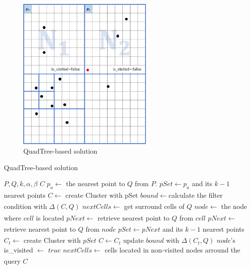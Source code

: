 \documentclass[a4paper,11pt]{report}
\theoremstyle{mytheoremstyle}
\begin{document}
\begin{figure}
    \begin{center}
        \includegraphics[width=0.6\textwidth]{images/solution-QuadTree2.pdf}
        \caption{QuadTree-based solution} \label{fig:solution-quadTree2}
    \end{center}
\end{figure}

\begin{algorithm}                      
\caption{QuadTree-based solution}         
\label{alg:quadtree}
\begin{algorithmic}[1]                  
\renewcommand{\algorithmicrequire}{\textbf{Input:}}
\renewcommand{\algorithmicensure}{\textbf{Output:}}
\REQUIRE $P,Q,k,\alpha, \beta$
\ENSURE $C$
\STATE $p_a \xleftarrow[]{}$ the nearest point to $Q$ from $P$.
\STATE $pSet \xleftarrow{} p_a$ and its $k-1$ nearest points
\STATE $C \xleftarrow[]{}$ create Cluster with pSet
\STATE $bound \xleftarrow[]{} $calculate the filter condition with $\Delta(C,Q)$
\STATE $nextCells \xleftarrow[]{} $ get surround cells of $Q$
\STATE $node \xleftarrow[]{}$ the node where $cell$ is located
\STATE $pNext \xleftarrow[]{}$ retrieve nearest point to $Q$ from $cell$
\ELSE
\STATE $pNext \xleftarrow[]{}$ retrieve nearest point to $Q$ from $node$
\ENDIF
\STATE $pSet \xleftarrow[]{} pNext$ and its $k-1$ nearest points
\STATE $C_t \xleftarrow{}$ create Cluster with $pSet$
\STATE $C \xleftarrow{} C_t$
\STATE update $bound$ with $\Delta(C_t,Q)$
\ENDIF
\STATE $node$'s is\_visited $\xleftarrow[]{}$ $true$
\ENDFOR
\STATE $nextCells \xleftarrow[]{} $ cells located in non-visited nodes arround the query
\ENDWHILE
\RETURN $C$
\end{algorithmic}
\end{algorithm}
\end{document}
